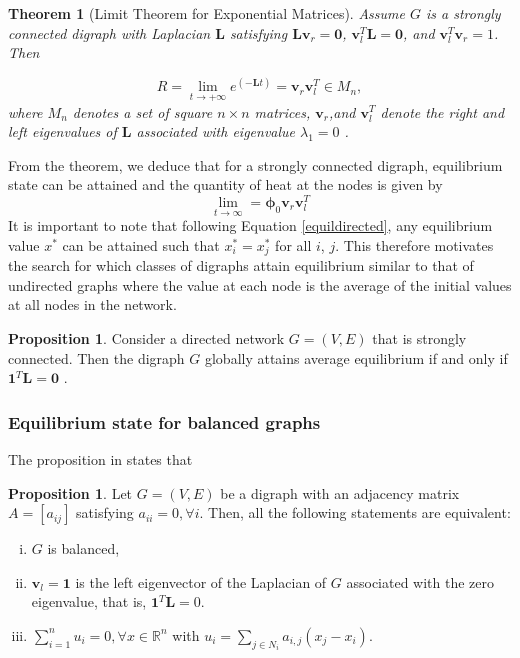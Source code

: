 \documentclass[10pt,a4paper]{article}
\theoremstyle{plain}
\newtheorem{thm}[subsection]{Theorem}
\theoremstyle{definition}
\newtheorem{prop}[subsection]{Proposition}
\begin{document}
        \begin{thm}[Limit Theorem for Exponential Matrices]
        	Assume $G$ is a strongly connected digraph with Laplacian $\mathbf{L}$ satisfying $\mathbf{L} \mathbf{v}_r = \mathbf{0}$, $\mathbf{v}_{l} ^T \mathbf{L} =\mathbf{0}$, and $\mathbf{v}_{l} ^T \mathbf{v}_r=1$. Then 
        	
        	\begin{equation}
        	 R = \lim_{t \longrightarrow +\infty} e^{(-\mathbf{L}t)
        	} = \mathbf{v}_r  \mathbf{v}_{l} ^T \in M_n,
        	\end{equation}
        	where $M_n$ denotes a set of square $n\times n$ matrices, $\mathbf{v}_r$,and $\mathbf{v}_{l} ^T$ denote the right and left eigenvalues of $\mathbf{L}$ associated with eigenvalue $\lambda_1 = 0$ \citep{saber2003agreement}.
        	\label{exponentialTheorem}
        \end{thm}
    From the theorem, we deduce that for a strongly connected digraph, equilibrium state can be attained and the quantity of heat at the nodes is given by
    \begin{equation}
    \lim_{t \longrightarrow \infty} =  \boldsymbol{\phi}_0  \mathbf{v}_r  \mathbf{v}_{l} ^T
    \label{equildirected}
    \end{equation}
    It is important to note that following Equation \ref{equildirected}, any equilibrium value $x^*$ can be attained such that $x^*_i =x^*_j$ for all $i$, $j$. This therefore motivates the search for which classes of digraphs attain equilibrium similar to that of undirected graphs where the value at each node is the average of the initial values at all nodes in the network.
    
    \begin{prop}
    Consider a directed network $G=(V,E)$ that is strongly connected. Then the digraph $G$ globally attains average equilibrium if and only if $\mathbf{1}^T \mathbf{L}= \mathbf{0}$ \citep{saber2003agreement}.
    \label{prop1}
    \end{prop} 

    \subsubsection{Equilibrium state for balanced graphs}
     The proposition in \citep{saber2003agreement} states that \\
     
     \begin{prop}
     Let $G=(V,E)$ be a digraph with an adjacency matrix $A=[a_{ij}]$ satisfying $a_{ii}=0, \forall i$. Then, all the following statements are equivalent:
     \begin{enumerate}[i)]
     	\item $G$ is balanced,
     	\item $\mathbf{v}_l = \mathbf{1}$ is the left eigenvector of the Laplacian of $G$ associated with the zero eigenvalue, that is, $\mathbf{1}^T \mathbf{L} = 0$.
     	\item $\sum_{i=1} ^ n u_i = 0, \forall x \in  \mathbb{R}^n$ with $u_i = \sum_{j \in N_i} a_{i,j} (x_j -x_i).$
     \end{enumerate}
     \label{prop1}
     \end{prop}
 
\end{document}
